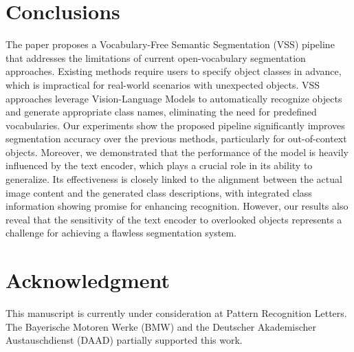 

\section{Conclusions}
The paper proposes a Vocabulary-Free Semantic Segmentation (VSS) pipeline that addresses the limitations of current open-vocabulary segmentation approaches. Existing methods require users to specify object classes in advance, which is impractical for real-world scenarios with unexpected objects. VSS approaches leverage Vision-Language Models to automatically recognize objects and generate appropriate class names, eliminating the need for predefined vocabularies. Our experiments show the proposed pipeline significantly improves segmentation accuracy over the previous methods, particularly for out-of-context objects. Moreover, we demonstrated that the performance of the model is heavily influenced by the text encoder, which plays a crucial role in its ability to generalize. Its effectiveness is closely linked to the alignment between the actual image content and the generated class descriptions, with integrated class information showing promise for enhancing recognition. However, our results also reveal that the sensitivity of the text encoder to overlooked objects represents a challenge for achieving a flawless segmentation system.

\section*{Acknowledgment}
This manuscript is currently under consideration at Pattern Recognition Letters.
The Bayerische Motoren Werke (BMW) and the Deutscher Akademischer Austauschdienst (DAAD) partially supported this work.
